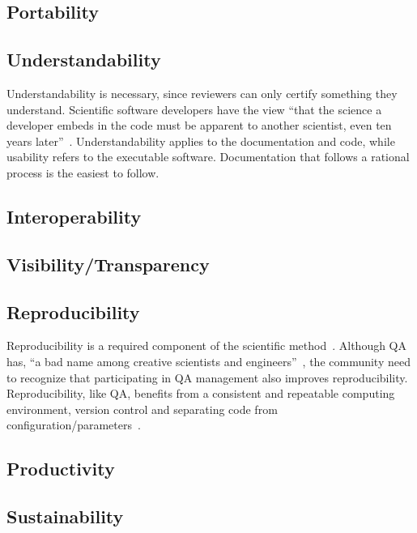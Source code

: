\documentclass[12pt]{article}
\begin{document}
\subsection{Portability}

\subsection{Understandability}

Understandability is necessary, since reviewers can only certify something they
understand.  Scientific software developers have the view ``that the science a
developer embeds in the code must be apparent to another scientist, even ten
years later''~\cite{Kelly2013}.  Understandability applies to the documentation
and code, while usability refers to the executable software.  Documentation that
follows a rational process is the easiest to follow.

\subsection{Interoperability}

\subsection{Visibility/Transparency}

\subsection{Reproducibility}

Reproducibility is a required component of the scientific
method~\cite{Davison2012}.  Although QA has, ``a bad name among creative
scientists and engineers''~\cite[p.~352]{Roache1998}, the community need to
recognize that participating in QA management also improves reproducibility.
Reproducibility, like QA, benefits from a consistent and repeatable computing
environment, version control and separating code from
configuration/parameters~\cite{Davison2012}.

\subsection{Productivity}


\subsection{Sustainability}
\end{document}
